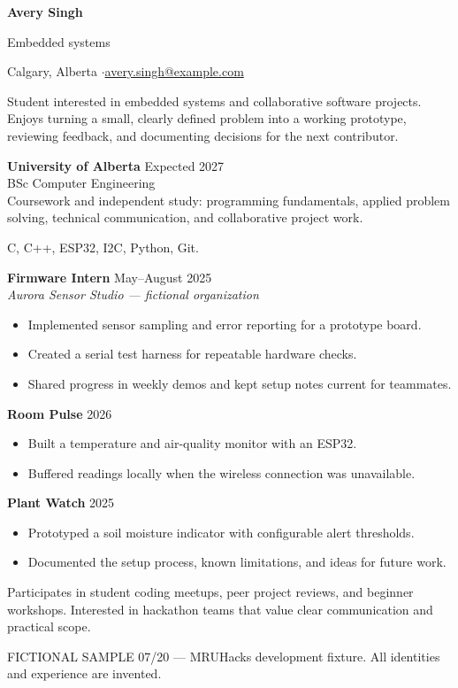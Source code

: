 
{\Huge\bfseries Avery Singh}\par
{\large\color{accent} Embedded systems}\par
Calgary, Alberta \enspace$\cdot$\enspace \href{mailto:avery.singh@example.com}{avery.singh@example.com}

Student interested in embedded systems and collaborative software projects.
Enjoys turning a small, clearly defined problem into a working prototype,
reviewing feedback, and documenting decisions for the next contributor.

\textbf{University of Alberta} \hfill Expected 2027\\
BSc Computer Engineering\\
Coursework and independent study: programming fundamentals, applied problem solving,
technical communication, and collaborative project work.

C, C++, ESP32, I2C, Python, Git.

\textbf{Firmware Intern} \hfill May--August 2025\\
\textit{Aurora Sensor Studio --- fictional organization}
\begin{itemize}
\item Implemented sensor sampling and error reporting for a prototype board.
\item Created a serial test harness for repeatable hardware checks.
\item Shared progress in weekly demos and kept setup notes current for teammates.
\end{itemize}

\textbf{Room Pulse} \hfill 2026
\begin{itemize}
\item Built a temperature and air-quality monitor with an ESP32.
\item Buffered readings locally when the wireless connection was unavailable.
\end{itemize}
\textbf{Plant Watch} \hfill 2025
\begin{itemize}
\item Prototyped a soil moisture indicator with configurable alert thresholds.
\item Documented the setup process, known limitations, and ideas for future work.
\end{itemize}

Participates in student coding meetups, peer project reviews, and beginner workshops.
Interested in hackathon teams that value clear communication and practical scope.

\vfill
{\footnotesize\color{gray} FICTIONAL SAMPLE 07/20 --- MRUHacks development fixture.
All identities and experience are invented.}

